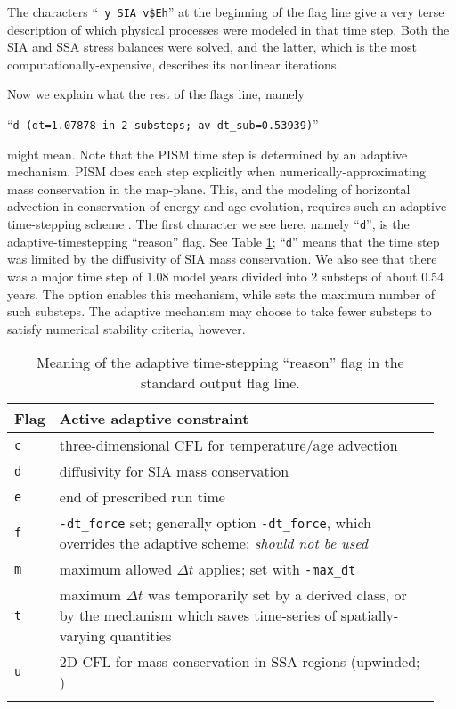The characters ``\texttt{ y SIA v\$Eh}'' at the beginning of the flag line give a very terse description of which physical processes were modeled in that time step.  Both the SIA and SSA stress balances were solved, and the latter, which is the most computationally-expensive, describes its nonlinear iterations.

Now we explain what the rest of the flags line, namely

``\texttt{d (dt=1.07878 in 2 substeps; av dt_sub=0.53939)}''

\noindent might mean.  Note that the PISM time step is determined by an
adaptive mechanism.  PISM does each step explicitly when
numerically-approximating mass conservation in the map-plane.  This, and the
modeling of horizontal advection in conservation of energy and age evolution,
requires such an adaptive time-stepping scheme \cite{BBL}.  The first character
we see here, namely ``\texttt{d}'', is the adaptive-timestepping ``reason''
flag.  See Table \ref{tab:adaptiveflag}; ``\texttt{d}'' means that the time
step was limited by the diffusivity of SIA mass conservation.  We also see that
there was a major time step of 1.08 model years divided into 2 substeps of
about 0.54 years.  The  option enables this mechanism, while
 sets the maximum number of such substeps. The adaptive
mechanism may choose to take fewer substeps to satisfy numerical stability
criteria, however.

\begin{table}[ht]
\centering
\begin{tabular}{p{0.05\linewidth}p{0.9\linewidth}}\toprule
\textbf{Flag} & \textbf{Active adaptive constraint} \\ \midrule
\texttt{c} & three-dimensional CFL for temperature/age advection \cite{BBL} \\
\texttt{d} & diffusivity for SIA mass conservation \cite{BBL,HindmarshPayne} \\
\texttt{e} & end of prescribed run time \\
\texttt{f} & \texttt{-dt_force} set; generally option \texttt{-dt_force}, which overrides the adaptive scheme; \emph{should not be used}  \\
\texttt{m} & maximum allowed $\Delta t$ applies; set with \texttt{-max_dt} \\
\texttt{t} & maximum $\Delta t$ was temporarily set by a derived class, or by the mechanism which saves time-series of spatially-varying quantities \\
\texttt{u} & 2D CFL for mass conservation in SSA regions (upwinded; \cite{BBssasliding})\\
\bottomrule
\normalsize
\end{tabular}
\caption{Meaning of the adaptive time-stepping ``reason'' flag in the standard output flag line.}
\label{tab:adaptiveflag}
\end{table}

